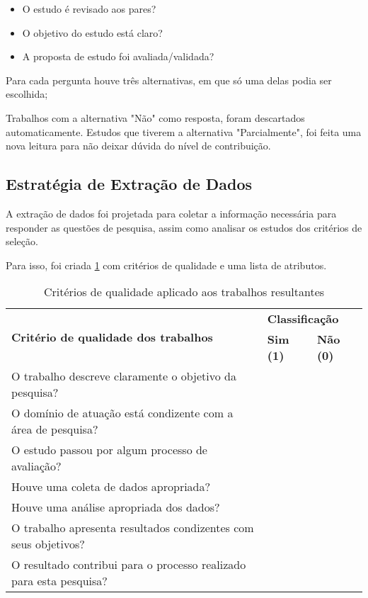 \begin{itemize}
	\item O estudo é revisado aos pares?
	\item O objetivo do estudo está claro?
	\item A proposta de estudo foi avaliada/validada?
\end{itemize}

Para cada pergunta houve três alternativas, em que só uma delas podia ser escolhida;

Trabalhos com a alternativa "Não" como resposta, foram descartados automaticamente. Estudos que tiverem a alternativa "Parcialmente", foi feita uma nova leitura para não deixar dúvida do nível de contribuição.

\subsection{Estratégia de Extração de Dados}
\label{sec:estrategia}
A extração de dados foi projetada para coletar a informação necessária para responder as questões de pesquisa, assim como analisar os estudos dos critérios de seleção. 

Para isso, foi criada \ref{table:criterios} com critérios de qualidade e uma lista de atributos.

\begin{table}[]
	\centering
	\caption{Critérios de qualidade aplicado aos trabalhos resultantes}
	\label{table:criterios}
	\begin{tabular}{|l|l|l|}
		\hline
		\multirow{2}{*}{\textbf{Critério de qualidade dos trabalhos}}                     & \multicolumn{2}{l|}{\textbf{Classificação}} \\ \cline{2-3} 
		& \textbf{Sim (1)}     & \textbf{Não (0)}     \\ \hline
		O trabalho descreve claramente o objetivo da pesquisa?              &                      &                      \\ \hline
		O domínio de atuação está condizente com a área de pesquisa?        &                      &                      \\ \hline
		O estudo passou por algum processo de avaliação?                    &                      &                      \\ \hline
		Houve uma coleta de dados apropriada?                               &                      &                      \\ \hline
		Houve uma análise apropriada dos dados?                             &                      &                      \\ \hline
		O trabalho apresenta resultados condizentes com seus objetivos?     &                      &                      \\ \hline
		O resultado contribui para o processo realizado para esta pesquisa? &                      &                      \\ \hline
	\end{tabular}
\end{table}



